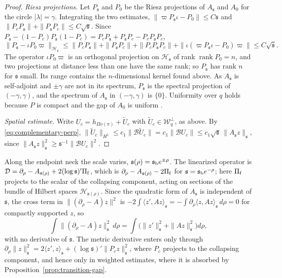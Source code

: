 \documentclass[11pt]{amsart}
\theoremstyle{definition}
\theoremstyle{remark}
\theoremstyle{plain}
\numberwithin{equation}{section}
\begin{document}
\begin{proof}
\emph{Riesz projections.} Let $P_{\mathfrak s}$ and $P_0$ be the Riesz projections of $A_{\mathfrak s}$ and
$A_0$ for the circle $|\lambda|=\gamma$. Integrating the two estimates,
$\|\varpi P_{\mathfrak s}\iota-P_0\|\le C{\mathfrak s}$ and $\|P_cP_{\mathfrak s}\|+\|P_{\mathfrak s} P_c\|\le C\sqrt{\mathfrak s}$.
Since $P_{\mathfrak s}-(1-P_c)P_{\mathfrak s}(1-P_c)=P_cP_{\mathfrak s}+P_{\mathfrak s} P_c-P_cP_{\mathfrak s} P_c$,
\[
\|P_{\mathfrak s}-\iota P_0\varpi\|_{\mathcal H_{\mathfrak s}}\le\|P_cP_{\mathfrak s}\|+\|P_{\mathfrak s} P_c\|+\|P_cP_{\mathfrak s}
P_c\|+\|\iota(\varpi P_{\mathfrak s}\iota-P_0)\varpi\|\le C\sqrt{\mathfrak s} .
\]
The operator $\iota P_0\varpi$ is an orthogonal projection on $\mathcal H_{\mathfrak s}$ of rank
$\operatorname{rank}P_0=n$, and two projections at distance less than one have the same
rank; so $P_{\mathfrak s}$ has rank $n$ for ${\mathfrak s}$ small. Its range contains the $n$-dimensional
kernel found above. As $A_{\mathfrak s}$ is self-adjoint and $\pm\gamma$ are not in its spectrum,
$P_{\mathfrak s}$ is the spectral projection of $(-\gamma,\gamma)$, and the spectrum of $A_{\mathfrak s}$ in
$(-\gamma,\gamma)$ is $\{0\}$. Uniformity over $q$ holds because $P$ is compact and the
gap of $A_0$ is uniform \cite[(4.24)]{DFL}.

\emph{Spatial estimate.} Write $U_c=h_{\Pi\nu(\pi)}+\tilde U_c$ with $\tilde U_c\in\mathcal
W^\perp_q$, as above. By \eqref{eq:complementary-perp},
$\|\tilde U_c\|_{H^1}\le c_1\|\mathcal B\tilde U_c\|=c_1\|\mathcal BU_c\|\le
c_1\sqrt{\mathfrak s}\,\|A_{\mathfrak s} z\|_{\mathfrak s}$, since $\|A_{\mathfrak s} z\|_{\mathfrak s}^2\ge{\mathfrak s}^{-1}\|\mathcal BU_c\|^2$.
\end{proof}

Along the endpoint neck the scale varies, ${\mathfrak s}(\rho)={\mathfrak s}_{\rm b}e^{\pm\rho}$. The
linearized operator is $\mathcal D=\partial_\rho-A_{{\mathfrak s}(\rho)}+2(\log{\mathfrak s})'\Pi_{\rm f}$,
which is $\partial_\rho-A_{{\mathfrak s}(\rho)}-2\Pi_{\rm f}$ for ${\mathfrak s}={\mathfrak s}_{\rm b}e^{-\rho}$; here $\Pi_{\rm f}$
projects to the scalar of the collapsing component, acting on sections of the
bundle of Hilbert spaces $\mathcal H_{{\mathfrak s}(\rho)}$. Since the quadratic form of
$A_{\mathfrak s}$ is independent of ${\mathfrak s}$, the cross term in
$\|(\partial_\rho-A)z\|^2$ is $-2\int\langle z',Az\rangle_{\mathfrak s}=-\int\partial_\rho\langle
z,Az\rangle_{\mathfrak s}\,d\rho=0$ for compactly supported $z$, so
\[
\int\|(\partial_\rho-A)z\|_{\mathfrak s}^2\,d\rho=\int\bigl(\|z'\|_{\mathfrak s}^2+\|Az\|_{\mathfrak s}^2\bigr)d\rho ,
\]
with no derivative of ${\mathfrak s}$. The metric derivative enters only through
$\partial_\rho\|z\|_{\mathfrak s}^2=2\langle z',z\rangle_{\mathfrak s}+(\log{\mathfrak s})'\|P_cz\|_{\mathfrak s}^2$, where $P_c$ projects to
the collapsing component, and hence only in weighted estimates, where it is
absorbed by Proposition~\ref{prop:transition-gap}.
\end{document}
